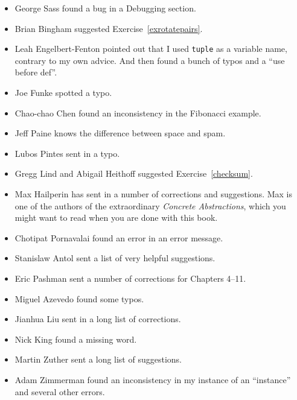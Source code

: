 \documentclass[10pt]{book}
\begin{document}
\begin{itemize}
\item George Sass found a bug in a Debugging section.

\item Brian Bingham suggested Exercise~\ref{exrotatepairs}.

\item Leah Engelbert-Fenton pointed out that I used {\tt tuple}
as a variable name, contrary to my own advice.  And then found
a bunch of typos and a ``use before def''.

\item Joe Funke spotted a typo.

\item Chao-chao Chen found an inconsistency in the Fibonacci example.

\item Jeff Paine knows the difference between space and spam.

\item Lubos Pintes sent in a typo.

\item Gregg Lind and Abigail Heithoff suggested Exercise~\ref{checksum}.

\item Max Hailperin has sent in a number of corrections and
  suggestions.  Max is one of the authors of the extraordinary {\em
    Concrete Abstractions}, which you might want to read when you are
  done with this book.

\item Chotipat Pornavalai found an error in an error message.

\item Stanislaw Antol sent a list of very helpful suggestions.

\item Eric Pashman sent a number of corrections for Chapters 4--11.

\item Miguel Azevedo found some typos.

\item Jianhua Liu sent in a long list of corrections.

\item Nick King found a missing word.

\item Martin Zuther sent a long list of suggestions.

\item Adam Zimmerman found an inconsistency in my instance
of an ``instance'' and several other errors.


\end{itemize}
\end{document}
